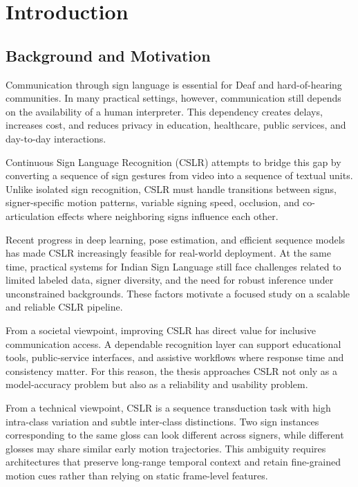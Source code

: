 \chapter{Introduction}

\section{Background and Motivation}

Communication through sign language is essential for Deaf and hard-of-hearing communities. In many practical settings, however, communication still depends on the availability of a human interpreter. This dependency creates delays, increases cost, and reduces privacy in education, healthcare, public services, and day-to-day interactions.

Continuous Sign Language Recognition (CSLR) attempts to bridge this gap by converting a sequence of sign gestures from video into a sequence of textual units. Unlike isolated sign recognition, CSLR must handle transitions between signs, signer-specific motion patterns, variable signing speed, occlusion, and co-articulation effects where neighboring signs influence each other.

Recent progress in deep learning, pose estimation, and efficient sequence models has made CSLR increasingly feasible for real-world deployment. At the same time, practical systems for Indian Sign Language still face challenges related to limited labeled data, signer diversity, and the need for robust inference under unconstrained backgrounds. These factors motivate a focused study on a scalable and reliable CSLR pipeline.

From a societal viewpoint, improving CSLR has direct value for inclusive communication access. A dependable recognition layer can support educational tools, public-service interfaces, and assistive workflows where response time and consistency matter. For this reason, the thesis approaches CSLR not only as a model-accuracy problem but also as a reliability and usability problem.

From a technical viewpoint, CSLR is a sequence transduction task with high intra-class variation and subtle inter-class distinctions. Two sign instances corresponding to the same gloss can look different across signers, while different glosses may share similar early motion trajectories. This ambiguity requires architectures that preserve long-range temporal context and retain fine-grained motion cues rather than relying on static frame-level features.

